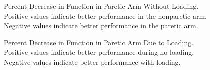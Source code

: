 \documentclass{article}
\begin{document}
\begin{figure}[!ht]
     \centering
     \hfill
	\caption{Percent Decrease in Function in Paretic Arm Without Loading. Positive values indicate better performance in the nonparetic arm. Negative values indicate better performance in the paretic arm. }
\end{figure}


\begin{figure}[!ht]
     \centering
     \hfill
	\caption{Percent Decrease in Function in Paretic Arm Due to Loading. Positive values indicate better performance during no loading. Negative values indicate better performance with loading.}
\end{figure}
\end{document}
